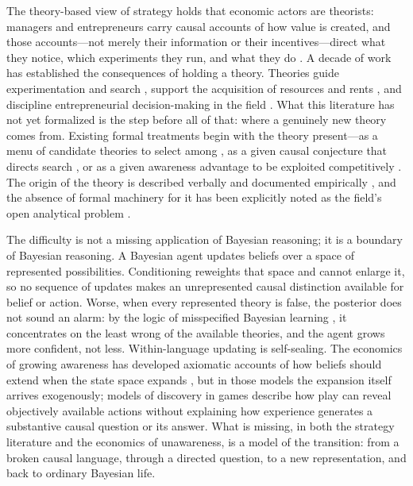 \documentclass[11pt]{article}
\theoremstyle{definition}
\begin{document}
The theory-based view of strategy holds that economic actors are theorists: managers and entrepreneurs carry causal accounts of how value is created, and those accounts---not merely their information or their incentives---direct what they notice, which experiments they run, and what they do \citep{FelinZenger2017,FelinGambardellaZenger2024}.
A decade of work has established the consequences of holding a theory.
Theories guide experimentation and search \citep{CamuffoEtAl2020,ChavdaGansStern2024}, support the acquisition of resources and rents \citep{EhrigZenger2024}, and discipline entrepreneurial decision-making in the field \citep{CamuffoEtAl2024}.
What this literature has not yet formalized is the step before all of that: where a genuinely new theory comes from.
Existing formal treatments begin with the theory present---as a menu of candidate theories to select among \citep{CamuffoEtAl2024}, as a given causal conjecture that directs search \citep{ChavdaGansStern2024}, or as a given awareness advantage to be exploited competitively \citep{EhrigZenger2024}.
The origin of the theory is described verbally and documented empirically \citep{OttHannah2024}, and the absence of formal machinery for it has been explicitly noted as the field's open analytical problem \citep{FelinGambardellaZenger2024}.

The difficulty is not a missing application of Bayesian reasoning; it is a boundary of Bayesian reasoning.
A Bayesian agent updates beliefs over a space of represented possibilities.
Conditioning reweights that space and cannot enlarge it, so no sequence of updates makes an unrepresented causal distinction available for belief or action.
Worse, when every represented theory is false, the posterior does not sound an alarm: by the logic of misspecified Bayesian learning \citep{Berk1966}, it concentrates on the least wrong of the available theories, and the agent grows more confident, not less.
Within-language updating is self-sealing.
The economics of growing awareness has developed axiomatic accounts of how beliefs should extend when the state space expands \citep{KarniViero2013,KarniViero2017,Viero2021}, but in those models the expansion itself arrives exogenously; models of discovery in games describe how play can reveal objectively available actions \citep{Schipper2021} without explaining how experience generates a substantive causal question or its answer.
What is missing, in both the strategy literature and the economics of unawareness, is a model of the transition: from a broken causal language, through a directed question, to a new representation, and back to ordinary Bayesian life.
\end{document}
